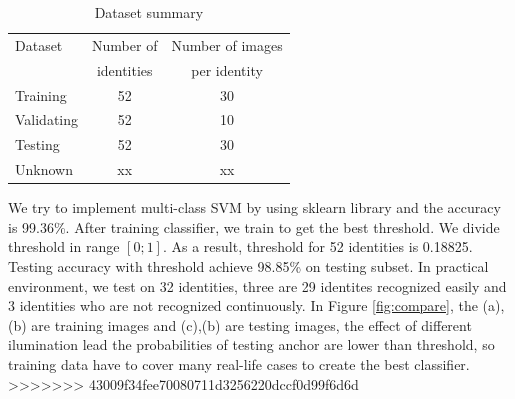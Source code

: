 \documentclass[journal, twocolumn]{IEEEtran}
\begin{document}
\begin{table}
\centering
	\caption{Dataset summary}
	\label{table:dataset}
		\begin{tabularx}{0.65\linewidth}{lcc}
		\toprule
		Dataset      &   Number of  &  Number of images  \\ 
		~            &  identities  &  per identity  \\
		\midrule
		Training     &   52  &  30  \\ 
		Validating   &   52  &  10  \\ 
		Testing      &   52  &  30  \\ 
		Unknown      &   xx  &  xx  \\ 
		\bottomrule
	\end{tabularx}
\end{table}


We try to implement multi-class SVM by using sklearn library and the accuracy is 99.36\%. After training classifier, we train to get the best threshold. We divide threshold in range $[0;1]$. As a result, threshold for 52 identities is 0.18825. Testing accuracy with threshold achieve 98.85\% on testing subset. In practical environment, we test on 32 identities, three are 29 identites recognized easily and 3 identities who are not recognized continuously. In Figure \ref{fig:compare}, the (a),(b) are training images and (c),(b) are testing images, the effect of different ilumination lead the probabilities of testing anchor are lower than threshold, so training data have to cover many real-life cases to create the best classifier.  
>>>>>>> 43009f34fee70080711d3256220dccf0d99f6d6d
\end{document}
